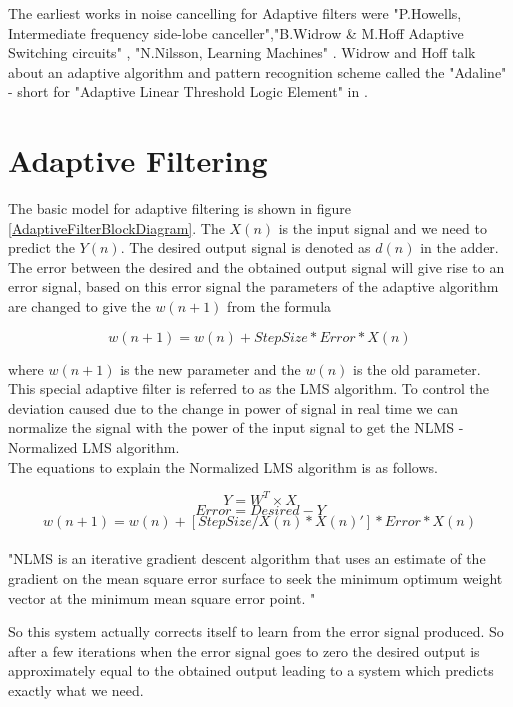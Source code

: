\documentclass[conference]{IEEEtran}
\begin{document}
The earliest works in noise cancelling for Adaptive filters were "P.Howells, Intermediate frequency side-lobe canceller"\cite{Howells_SideLobeCanceller},"B.Widrow \& M.Hoff Adaptive Switching circuits"  \cite{WidrowHoffdaptiveSwitching}, "N.Nilsson, Learning Machines" \cite{McgrawhillNilssonLearningMachines}. 
Widrow and Hoff talk about an adaptive algorithm and pattern recognition scheme called the "Adaline" - short for "Adaptive  Linear Threshold Logic Element" in \cite{WidrowHoffdaptiveSwitching}. 


\section{Adaptive Filtering}

The basic model for adaptive filtering is shown in figure \ref{AdaptiveFilterBlockDiagram}. The $X(n)$ is the input signal and we need to predict the $Y(n)$. The desired output signal is denoted as $d(n)$ in the adder. The error between the desired and the obtained output signal will give rise to an error signal, based on this error signal the parameters of the adaptive algorithm are changed to give the $w(n+1)$ from the formula 

$$ w(n+1) = w(n) + StepSize * Error * X(n)  $$

where $w(n+1)$ is the new parameter and the $w(n)$ is the old parameter. This special adaptive filter is referred to as the LMS algorithm. To control the deviation caused due to the change in power of signal in real time we can normalize the signal with the power of the input signal to get the NLMS - Normalized LMS algorithm. \\

The equations to explain the Normalized LMS algorithm is as follows.


$$ Y = W^{T} \times  X$$
$$ Error = Desired - Y $$
$$ w(n+1) = w(n) + [StepSize/X(n) *X(n)'] * Error * X(n)  $$ \\

"NLMS is an iterative gradient descent algorithm that uses an estimate of the gradient on the mean square error surface to seek the minimum optimum weight vector at the minimum mean square error point. "\cite{GloverAdaptiveNoiseCancelling}

So this system actually corrects itself to learn from the error signal produced. So after a few iterations when the error signal goes to zero the desired output is approximately equal to the obtained output leading to a system which predicts exactly what we need. 
 
\end{document}
